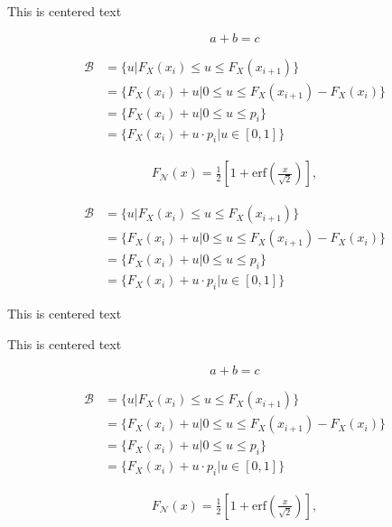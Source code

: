 
\begin{center}
This is centered text
\end{center}

\[
a + b = c
\]


\begin{align*}
    \mathcal{B} &=\{u | F_X(x_i) \leq u \leq F_X(x_{i+1})\} \\
                &= \{F_X(x_i) + u | 0 \leq u \leq F_X(x_{i+1}) - F_X(x_i)\} \\
                &=\{F_X(x_i) + u | 0 \leq u \leq p_i\}\\
                &=  \{F_X(x_i) + u \cdot p_i | u \in [0,1] \}
\end{align*}


\begin{align*}
    F_{\mathcal{N}}(x)=\frac{1}{2} \left[1 + \text{erf}\left( \frac{x}{\sqrt{2}} \right) \right] ,
\end{align*}

\begin{align*}
    \mathcal{B} &=\{u | F_X(x_i) \leq u \leq F_X(x_{i+1})\} \\
                &= \{F_X(x_i) + u | 0 \leq u \leq F_X(x_{i+1}) - F_X(x_i)\} \\
                &=\{F_X(x_i) + u | 0 \leq u \leq p_i\}\\
                &=  \{F_X(x_i) + u \cdot p_i | u \in [0,1] \}
\end{align*}

\begin{center}
This is centered text
\end{center}


\begin{center}
This is centered text
\end{center}

\[
a + b = c
\]


\begin{align*}
    \mathcal{B} &=\{u | F_X(x_i) \leq u \leq F_X(x_{i+1})\} \\
                &= \{F_X(x_i) + u | 0 \leq u \leq F_X(x_{i+1}) - F_X(x_i)\} \\
                &=\{F_X(x_i) + u | 0 \leq u \leq p_i\}\\
                &=  \{F_X(x_i) + u \cdot p_i | u \in [0,1] \}
\end{align*}


\begin{align*}
    F_{\mathcal{N}}(x)=\frac{1}{2} \left[1 + \text{erf}\left( \frac{x}{\sqrt{2}} \right) \right] ,
\end{align*}

